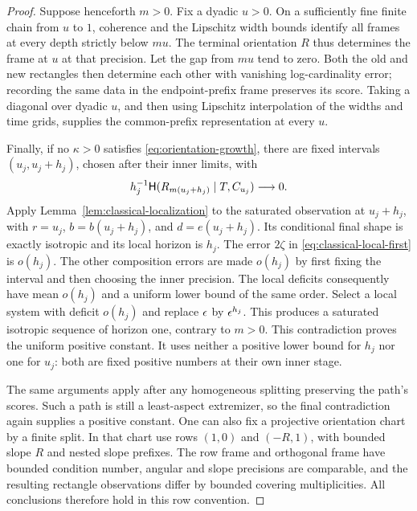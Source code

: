\begin{proof}
Suppose henceforth $m>0$.  Fix a dyadic $u>0$.  On a sufficiently fine
finite chain from $u$ to $1$, coherence and the Lipschitz width bounds
identify all frames at every depth strictly below $mu$.  The terminal
orientation $R$ thus determines the frame at $u$ at that precision.
Let the gap from $mu$ tend to zero.  Both the old and new rectangles
then determine each other with vanishing log-cardinality error;
recording the same data in the endpoint-prefix frame preserves its
score.  Taking a diagonal over dyadic $u$, and then using Lipschitz
interpolation of the widths and time grids, supplies the common-prefix
representation at every $u$.

Finally, if no $\kappa>0$ satisfies \eqref{eq:orientation-growth},
there are fixed intervals $(u_j,u_j+h_j)$, chosen after their inner
limits, with
\[
 h_j^{-1}\mathsf H(R_{m(u_j+h_j)}\mid T,C_{u_j})\longrightarrow0.
\]
Apply Lemma~\ref{lem:classical-localization} to the saturated observation
at $u_j+h_j$, with $r=u_j$, $b=b(u_j+h_j)$, and
$d=e(u_j+h_j)$.  Its conditional final shape is exactly isotropic and
its local horizon is $h_j$.  The error $2\zeta$ in
\eqref{eq:classical-local-first} is $o(h_j)$.  The other composition
errors are made $o(h_j)$ by first fixing the interval and then choosing
the inner precision.  The local deficits consequently have mean
$o(h_j)$ and a uniform lower bound of the same order.  Select a local
system with deficit $o(h_j)$ and replace $\epsilon$ by $\epsilon^{h_j}$.
This produces a saturated isotropic sequence of horizon one, contrary
to $m>0$.  This contradiction proves the uniform positive constant.
It uses neither a positive lower bound for $h_j$ nor one for
$u_j$: both are fixed positive numbers at their own inner stage.

The same arguments apply after any homogeneous splitting preserving
the path's scores.  Such a path is still a least-aspect extremizer, so
the final contradiction again supplies a positive constant.  One can
also fix a projective orientation chart by a finite split.  In that
chart use rows $(1,0)$ and $(-R,1)$, with bounded slope $R$ and nested
slope prefixes.  The row frame and orthogonal frame have bounded
condition number, angular and slope precisions are comparable, and
the resulting rectangle observations differ by bounded covering
multiplicities.  All conclusions therefore hold in this row convention.
\end{proof}

